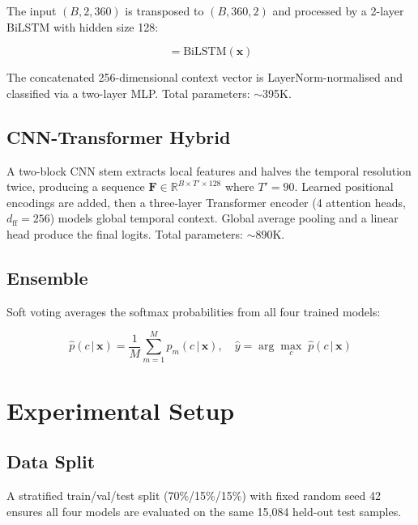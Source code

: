 \documentclass[conference]{IEEEtran}
\begin{document}
The input $(B, 2, 360)$ is transposed to $(B, 360, 2)$ and processed by a 2-layer BiLSTM with hidden size 128:

\begin{equation}
[\,\mathbf{h}^{\to}_{T},\; \mathbf{h}^{\leftarrow}_{0}\,] = \text{BiLSTM}(\mathbf{x})
\end{equation}

The concatenated 256-dimensional context vector is LayerNorm-normalised and classified via a two-layer MLP. Total parameters: $\sim$395K.

\subsection{CNN-Transformer Hybrid}

A two-block CNN stem extracts local features and halves the temporal resolution twice, producing a sequence $\mathbf{F} \in \mathbb{R}^{B \times T' \times 128}$ where $T'=90$. Learned positional encodings are added, then a three-layer Transformer encoder (4 attention heads, $d_\text{ff}=256$) models global temporal context. Global average pooling and a linear head produce the final logits. Total parameters: $\sim$890K.

\subsection{Ensemble}

Soft voting averages the softmax probabilities from all four trained models:

\begin{equation}
\hat{p}(c\,|\,\mathbf{x}) = \frac{1}{M}\sum_{m=1}^{M} p_m(c\,|\,\mathbf{x}), \quad \hat{y} = \arg\max_c\; \hat{p}(c\,|\,\mathbf{x})
\end{equation}

\section{Experimental Setup}

\subsection{Data Split}

A stratified train/val/test split (70\%/15\%/15\%) with fixed random seed 42 ensures all four models are evaluated on the same 15,084 held-out test samples.
\end{document}
